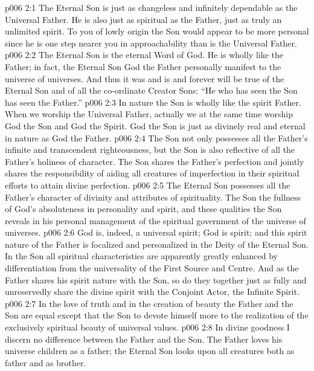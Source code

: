 \vs p006 2:1 The Eternal Son is just as changeless and infinitely dependable as the Universal Father. He is also just as spiritual as the Father, just as truly an unlimited spirit. To you of lowly origin the Son would appear to be more personal since he is one step nearer you in approachability than is the Universal Father.
\vs p006 2:2 The Eternal Son is the eternal Word of God. He is wholly like the Father; in fact, the Eternal Son  God the Father personally manifest to the universe of universes. And thus it was and is and forever will be true of the Eternal Son and of all the co\hyp{}ordinate Creator Sons: “He who has seen the Son has seen the Father.”
\vs p006 2:3 In nature the Son is wholly like the spirit Father. When we worship the Universal Father, actually we at the same time worship God the Son and God the Spirit. God the Son is just as divinely real and eternal in nature as God the Father.
\vs p006 2:4 The Son not only possesses all the Father’s infinite and transcendent righteousness, but the Son is also reflective of all the Father’s holiness of character. The Son shares the Father’s perfection and jointly shares the responsibility of aiding all creatures of imperfection in their spiritual efforts to attain divine perfection.
\vs p006 2:5 The Eternal Son possesses all the Father’s character of divinity and attributes of spirituality. The Son  the fullness of God’s absoluteness in personality and spirit, and these qualities the Son reveals in his personal management of the spiritual government of the universe of universes.
\vs p006 2:6 God is, indeed, a universal spirit; God is spirit; and this spirit nature of the Father is focalized and personalized in the Deity of the Eternal Son. In the Son all spiritual characteristics are apparently greatly enhanced by differentiation from the universality of the First Source and Centre. And as the Father shares his spirit nature with the Son, so do they together just as fully and unreservedly share the divine spirit with the Conjoint Actor, the Infinite Spirit.
\vs p006 2:7 In the love of truth and in the creation of beauty the Father and the Son are equal except that the Son  to devote himself more to the realization of the exclusively spiritual beauty of universal values.
\vs p006 2:8 In divine goodness I discern no difference between the Father and the Son. The Father loves his universe children as a father; the Eternal Son looks upon all creatures both as father and as brother.
